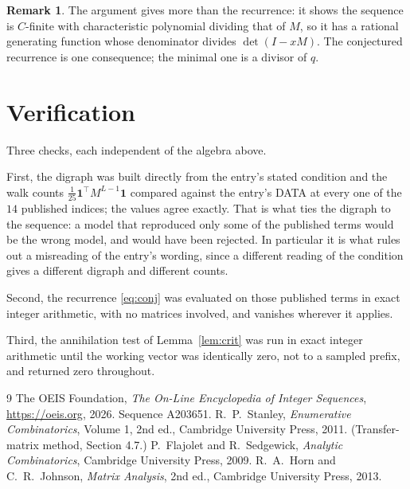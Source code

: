 \documentclass[11pt,a4paper]{article}
\theoremstyle{plain}
\theoremstyle{definition}
\newtheorem{remark}[theorem]{Remark}
\begin{document}
\begin{remark}
The argument gives more than the recurrence: it shows the sequence is $C$-finite with
characteristic polynomial dividing that of $M$, so it has a rational generating function
whose denominator divides $\det(I-xM)$. The conjectured recurrence is one consequence; the
minimal one is a divisor of $q$.
\end{remark}

\section{Verification}

Three checks, each independent of the algebra above.

First, the digraph was built directly from the entry's stated condition and the walk counts
$\tfrac1{25}\mathbf{1}^{\!\top}M^{L-1}\mathbf{1}$ compared against the entry's DATA at
every one of the $14$ published indices; the values agree exactly. That is what ties
the digraph to the sequence: a model that reproduced only some of the published terms would
be the wrong model, and would have been rejected. In particular it is what rules out a
misreading of the entry's wording, since a different reading of the condition gives a
different digraph and different counts.

Second, the recurrence \eqref{eq:conj} was evaluated on those published terms in exact
integer arithmetic, with no matrices involved, and vanishes wherever it applies.

Third, the annihilation test of Lemma~\ref{lem:crit} was run in exact integer arithmetic
until the working vector was identically zero, not to a sampled prefix, and returned zero
throughout.

\begin{thebibliography}{9}
 The OEIS Foundation, \emph{The On-Line Encyclopedia of Integer
Sequences}, \url{https://oeis.org}, 2026. Sequence A203651.
 R.~P.~Stanley, \emph{Enumerative Combinatorics}, Volume 1, 2nd ed.,
Cambridge University Press, 2011. (Transfer-matrix method, Section 4.7.)
 P.~Flajolet and R.~Sedgewick, \emph{Analytic Combinatorics}, Cambridge
University Press, 2009.
 R.~A.~Horn and C.~R.~Johnson, \emph{Matrix Analysis}, 2nd ed., Cambridge
University Press, 2013.
\end{thebibliography}
\end{document}

